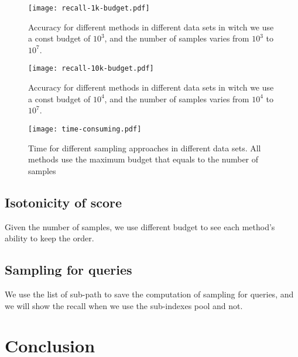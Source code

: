 \documentclass[letterpaper]{article}
\begin{document}
\begin{figure}[ht]
  \centering
  \texttt{[image: recall-1k-budget.pdf]}\\
  \caption{Accuracy for different methods in different data sets in witch we use a const budget of $10^3$, and the number of samples varies from $10^3$ to $10^7$.}
  \label{Fig:Recall1kBudget}
\end{figure}

\begin{figure}[ht]
  \centering
  \texttt{[image: recall-10k-budget.pdf]}\\
  \caption{Accuracy for different methods in different data sets in witch we use a const budget of $10^4$, and the number of samples varies from $10^4$ to $10^7$.}
  \label{Fig:Recall10kBudget}
\end{figure}

\begin{figure}[ht]
  \centering
  \texttt{[image: time-consuming.pdf]}\\
  \caption{Time for different sampling approaches in different data sets. All methods use the maximum budget that equals to the number of samples}
  \label{Fig:Recall10kBudget}
\end{figure}
\subsection{Isotonicity of score}
Given the number of samples, we use different budget to see each method's ability to keep the order.

\subsection{Sampling for queries}
We use the list of sub-path to save the computation of sampling for queries, and we will show the recall when we use the sub-indexes pool and not.

\section{Conclusion}




\end{document}
